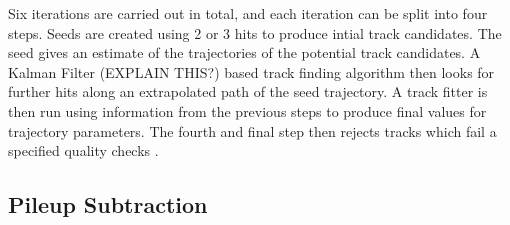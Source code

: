 Six iterations are carried out in total, and each iteration can be split into four steps. Seeds are created
using 2 or 3 hits to produce intial track candidates. The seed gives an estimate of the trajectories of the
potential track candidates. A Kalman Filter (EXPLAIN THIS?) \cite{kalman_filter} based track finding
algorithm then looks for further hits along an extrapolated path of the seed trajectory. A track fitter is then run using information
from the previous steps to produce final values for trajectory parameters. The fourth and final step then
rejects tracks which fail a specified quality checks \cite{track_reconstruction}.

\subsection{Pileup Subtraction}
\label{ss:pileup_subtraction}
